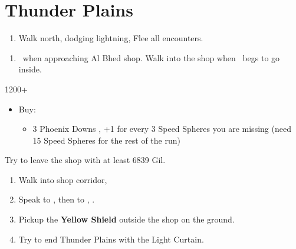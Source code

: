 \chapter{Thunder Plains}

\begin{enumerate}
    \item Walk north, dodging lightning, Flee all encounters.
\end{enumerate}
\begin{enumerate}[resume]
    \item \sd\ when approaching Al Bhed shop. Walk into the shop when \rikku\ begs to go inside.
\end{enumerate}
\begin{shop}{1200+}
    \begin{itemize}
        \item Buy:
        \begin{itemize}
            \item 3 Phoenix Downs
            , +1 for every 3 Speed Spheres you are missing (need 15 Speed Spheres for the rest of the run)
        \end{itemize}
    \end{itemize}
    Try to leave the shop with at least 6839 Gil.
\end{shop}
\begin{enumerate}[resume]
    \item Walk into shop corridor, \cs[2:00]
    \item Speak to \auron, then to \rikku, \sd.
    \item Pickup the \textbf{Yellow Shield} outside the shop on the ground.
    \item Try to end Thunder Plains with the Light Curtain.
\end{enumerate}

